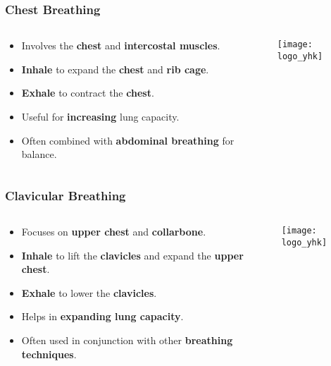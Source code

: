 \begin{frame}[fragile]\frametitle{Chest Breathing}
\begin{columns}
    \begin{column}[T]{0.5\linewidth}
      \begin{itemize}
        \item Involves the \textbf{chest} and \textbf{intercostal muscles}.
        \item \textbf{Inhale} to expand the \textbf{chest} and \textbf{rib cage}.
        \item \textbf{Exhale} to contract the \textbf{chest}.
        \item Useful for \textbf{increasing} lung capacity.
        \item Often combined with \textbf{abdominal breathing} for balance.
      \end{itemize}
    \end{column}
    \begin{column}[T]{0.5\linewidth}
        \begin{center}
        \texttt{[image: logo\_yhk]}
        \end{center}	
    \end{column}
\end{columns}
\end{frame}

\begin{frame}[fragile]\frametitle{Clavicular Breathing}
\begin{columns}
    \begin{column}[T]{0.5\linewidth}
      \begin{itemize}
        \item Focuses on \textbf{upper chest} and \textbf{collarbone}.
        \item \textbf{Inhale} to lift the \textbf{clavicles} and expand the \textbf{upper chest}.
        \item \textbf{Exhale} to lower the \textbf{clavicles}.
        \item Helps in \textbf{expanding lung capacity}.
        \item Often used in conjunction with other \textbf{breathing techniques}.
      \end{itemize}
    \end{column}
    \begin{column}[T]{0.5\linewidth}
        \begin{center}
        \texttt{[image: logo\_yhk]}
        \end{center}	
    \end{column}
\end{columns}
\end{frame}

